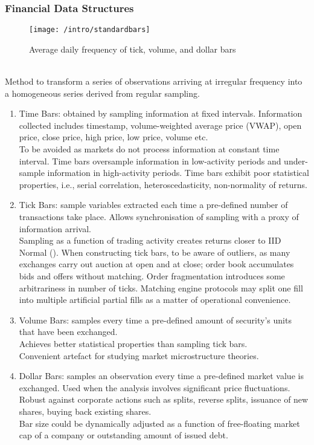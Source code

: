 \subsubsection{Financial Data Structures}

\begin{figure}[H]
\centering
\texttt{[image: /intro/standardbars]}
\caption{Average daily frequency of tick, volume, and dollar bars}
\end{figure}

\begin{remark} \\
Method to transform a series of observations arriving at irregular frequency into a homogeneous series derived from regular sampling.
\begin{enumerate}[label=\roman*.]
\setlength{\itemsep}{0pt}
\item Time Bars: obtained by sampling information at fixed intervals. Information collected includes timestamp, volume-weighted average price (VWAP), open price, close price, high price, low price, volume etc.\\
To be avoided as markets do not process information at constant time interval. Time bars oversample information in low-activity periods and under-sample information in high-activity periods. Time bars exhibit poor statistical properties, i.e., serial correlation, heteroscedasticity, non-normality of returns.
\item Tick Bars: sample variables extracted each time a pre-defined number of transactions take place. Allows synchronisation of sampling with a proxy of information arrival.\\
Sampling as a function of trading activity creates returns closer to IID Normal (\cite{Thierry_Helyette_2000}). When constructing tick bars, to be aware of outliers, as many exchanges carry out auction at open and at close; order book accumulates bids and offers without matching. Order fragmentation introduces some arbitrariness in number of ticks. Matching engine protocols may split one fill into multiple artificial partial fills as a matter of operational convenience.
\item Volume Bars: samples every time a pre-defined amount of security's units that have been exchanged.\\
Achieves better statistical properties than sampling tick bars.\\
Convenient artefact for studying market microstructure theories.
\item Dollar Bars: samples an observation every time a pre-defined market value is exchanged. Used when the analysis involves significant price fluctuations. Robust against corporate actions such as splits, reverse splits, issuance of new shares, buying back existing shares.\\
Bar size could be dynamically adjusted as a function of free-floating market cap of a company or outstanding amount of issued debt.
\end{enumerate}
\end{remark}

